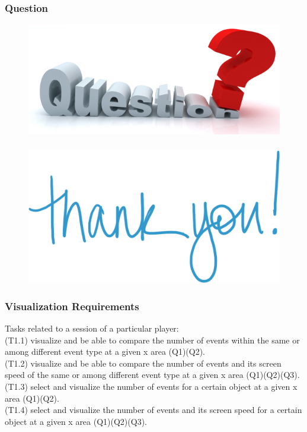 \documentclass{beamer}
\begin{document}
\begin{frame}
\frametitle{Question}
\begin{figure}
\includegraphics[scale=1.3]{images/question.png}
\end{figure}
\end{frame}

\begin{frame}
\frametitle{}
\begin{figure}
\includegraphics[scale=0.5]{images/thank_you.png}
\end{figure}
\end{frame}

\begin{frame}
\frametitle{Visualization Requirements}
Tasks related to a session of a particular player:\\
(T1.1) visualize and be able to compare the number of events within the same or among different event type at a given x area (Q1)(Q2). \\
(T1.2) visualize and be able to compare the number of events and its screen speed of the same or among different event type at a given x area (Q1)(Q2)(Q3). \\
(T1.3) select and visualize the number of events for a certain object at a given x area (Q1)(Q2). \\
(T1.4) select and visualize the number of events and its screen speed for a certain object at a given x area (Q1)(Q2)(Q3). 
\end{frame}
\end{document}
